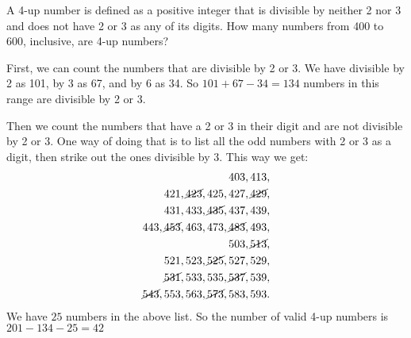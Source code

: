 \documentclass[11pt,twoside]{scrartcl}
\begin{document}
\begin{problem}
    A 4-up number is defined as a positive integer that is divisible by neither 2 nor 3 and does not have 2 or 3 as any of its digits. How many numbers from 400 to 600, inclusive, are 4-up numbers?
    \begin{sketch}
        First, we can count the numbers that are divisible by 2 or 3. We have divisible by 2 as 101, by 3 as 67, and by 6 as 34. So $101 + 67 - 34 = 134$ numbers in this range are divisible by 2 or 3. 

        Then we count the numbers that have a 2 or 3 in their digit and are not divisible by 2 or 3. One way of doing that is to list all the odd numbers with 2 or 3 as a digit, then strike out the ones divisible by 3.
        This way we get:
        \begin{align*}
            403,413, \\
            421, \cancel{423}, 425, 427, \cancel{429}, \\
            431, 433, \cancel{435}, 437, 439, \\
            443, \cancel{453}, 463, 473, \cancel{483}, 493, \\
            503,\cancel{513}, \\
            521, 523, \cancel{525}, 527, 529, \\
            \cancel{531}, 533, 535, \cancel{537}, 539, \\
            \cancel{543}, 553, 563, \cancel{573}, 583, 593. \\
        \end{align*}
        We have $25$ numbers in the above list. So the number of valid 4-up numbers is $201 - 134 -25 = \boxed{42}$
    \end{sketch}
\end{problem}
\end{document}
